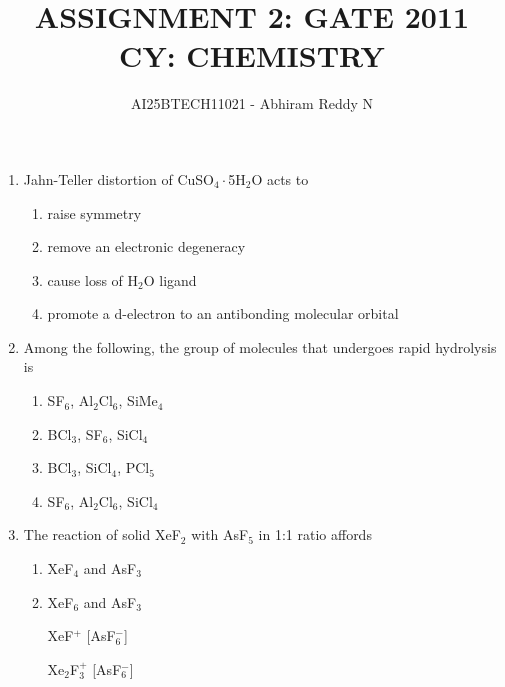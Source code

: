 \documentclass[journal,12pt,onecolumn]{IEEEtran}
\theoremstyle{remark}
\begin{document}
\title{
ASSIGNMENT 2: GATE 2011 \\
CY: CHEMISTRY}
\author{AI25BTECH11021 - Abhiram Reddy N}
\maketitle


\begin{enumerate} 


\item    Jahn-Teller distortion of CuSO$_4\cdot$5H$_2$O acts to \hfill{}
 

\begin{multicols}{2}
\begin{enumerate}[label=(\Alph*), leftmargin=*]
\item raise symmetry  
\item remove an electronic degeneracy  
\item cause loss of H$_2$O ligand  
\item promote a d-electron to an antibonding molecular orbital  
\end{enumerate}
\end{multicols}
 

\item    Among the following, the group of molecules that undergoes rapid hydrolysis is \hfill{}
 

\begin{multicols}{2}
\begin{enumerate}[label=(\Alph*), leftmargin=*]
\item SF$_6$, Al$_2$Cl$_6$, SiMe$_4$  
\item BCl$_3$, SF$_6$, SiCl$_4$  
\item BCl$_3$, SiCl$_4$, PCl$_5$  
\item SF$_6$, Al$_2$Cl$_6$, SiCl$_4$  
\end{enumerate}
\end{multicols}
 

\item    The reaction of solid XeF$_2$ with AsF$_5$ in 1:1 ratio affords \hfill{}
 

\begin{multicols}{2}
\begin{enumerate}[label=(\Alph*), leftmargin=*]
\item XeF$_4$ and AsF$_3$  
\item XeF$_6$ and AsF$_3$  
\item [XeF$^+$][AsF$_6^-$]  
\item [Xe$_2$F$_3^+$][AsF$_6^-$]  
\end{enumerate}
\end{multicols}
 


\end{enumerate}
\end{document}

